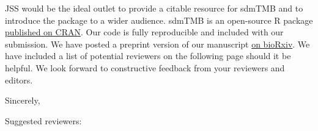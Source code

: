 \documentclass[letterpaper]{letter}
\providecommand{\pkg}[1]{{\normalfont\fontseries{b}\selectfont #1}}
\let\proglang=\textsf
\begin{document}
\begin{letter}{}

JSS would be the ideal outlet to provide a citable resource for \pkg{sdmTMB} and to introduce the package to a wider audience. \pkg{sdmTMB} is an open-source \proglang{R} package \href{https://CRAN.R-project.org/package=sdmTMB}{published on CRAN}. Our code is fully reproducible and included with our submission. We have posted a preprint version of our manuscript \href{https://doi.org/10.1101/2022.03.24.485545}{on bioRxiv}.  We have included a list of potential reviewers on the following page should it be helpful. We look forward to constructive feedback from your reviewers and editors.

\vspace{2mm}
\closing{Sincerely,\\
}

\vspace{6mm}

Suggested reviewers:



\end{letter}
\end{document}
